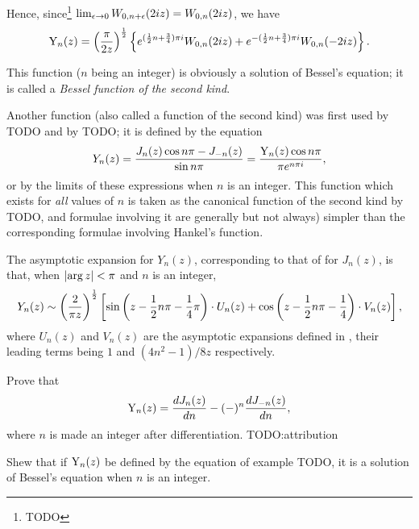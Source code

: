 \documentclass{book}
\begin{document}
    Hence, since\footnote{TODO}
    $\lim_{\epsilon\rightarrow 0} W_{0,n+\epsilon}(2iz) = W_{0,n}(2iz)$, we
    have
    $$
    \mathrm{Y}_n(z)
    =
    \left(  \frac{\pi}{2z}  \right)^{\frac{1}{2}}
    \left\{ 
      e^{(\frac{1}{2} n + \frac{3}{4}) \pi i} W_{0,n}(2iz)
      +
      e^{-(\frac{1}{2} n + \frac{3}{4})\pi i} W_{0,n}(-2iz)
     \right\}.
    $$

    This function ($n$ being an integer) is obviously a solution of
    Bessel's equation; it is called a \emph{Bessel function of the
      second kind}.

    Another function (also called a function of the second kind) was
    first used by TODO and by TODO; it is defined by the equation
    $$
    Y_n(z) = \frac{J_n(z) \cos n\pi - J_{-n}(z)}{\sin n\pi}
    = \frac{\mathrm{Y}_n(z) \cos n\pi}{\pi e^{n\pi i}},
    $$
    or by the limits of these expressions when $n$ is an integer. This
    function which exists for \emph{all} values of $n$ is taken as the
    canonical function of the second kind by TODO, and formulae
    involving it are generally but not always) simpler than the
    corresponding formulae involving Hankel's function.

    The asymptotic expansion for $Y_n(z)$, corresponding to that of
     for $J_n(z)$, is that, when
    $\left| \arg z \right| < \pi$ and $n$ is an integer,
    $$
    Y_n(z)
    \sim
    \left(  \frac{2}{\pi z}  \right)^{\frac{1}{2}}
    \left[  \sin\left( z - \frac{1}{2} n \pi - \frac{1}{4} \pi \right)
      \cdot U_n(z)
      + \cos\left( z - \frac{1}{2} n \pi - \frac{1}{4} \right) \cdot V_n(z)
     \right],
    $$
    where $U_n(z)$ and $V_n(z)$ are the asymptotic expansions defined
    in , their leading terms being $1$ and
    $(4n^2-1)/8z$ respectively.
    \begin{wandwexample}
      Prove that
      $$
      \mathrm{Y}_n(z)
      =
      \frac{dJ_n(z)}{dn}
      -
      (-)^n \frac{dJ_{-n}(z)}{dn},
      $$
      where $n$ is made an integer after differentiation.
      TODO:attribution
    \end{wandwexample}
    \begin{wandwexample}
      Shew that if $\mathrm{Y}_n(z)$ be defined by the equation of example
      TODO, it is a solution of Bessel's equation when $n$ is an integer.
    \end{wandwexample}
  
\end{document}
